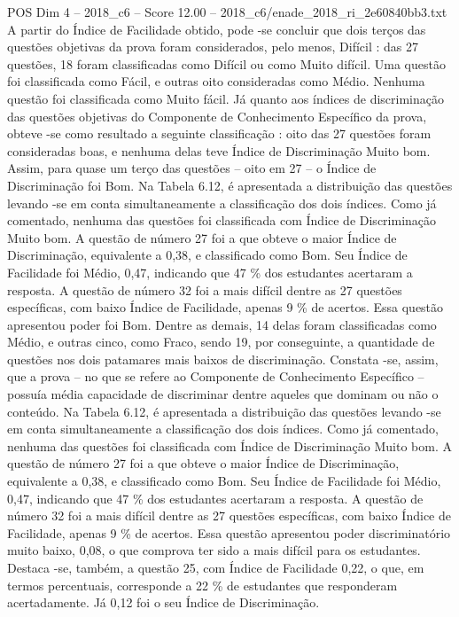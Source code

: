 \begin{textsample}{POS Dim 4 – 2018\_c6 – Score 12.00 – 2018\_c6/enade\_2018\_ri\_2e60840bb3.txt}
A partir do Índice de Facilidade obtido, pode -se concluir que dois terços das questões objetivas da prova foram considerados, pelo menos, Difícil : das 27 questões, 18 foram classificadas como Difícil ou como Muito difícil.
Uma questão foi classificada como Fácil, e outras oito consideradas como Médio.
Nenhuma questão foi classificada como Muito fácil.
Já quanto aos índices de discriminação das questões objetivas do Componente de Conhecimento Específico da prova, obteve -se como resultado a seguinte classificação : oito das 27 questões foram consideradas boas, e nenhuma delas teve Índice de Discriminação Muito bom.
Assim, para quase um terço das questões – oito em 27 – o Índice de Discriminação foi Bom.
Na Tabela 6.12, é apresentada a distribuição das questões levando -se em conta simultaneamente a classificação dos dois índices.
Como já comentado, nenhuma das questões foi classificada com Índice de Discriminação Muito bom.
A questão de número 27 foi a que obteve o maior Índice de Discriminação, equivalente a 0,38, e classificado como Bom.
Seu Índice de Facilidade foi Médio, 0,47, indicando que 47 \% dos estudantes acertaram a resposta.
A questão de número 32 foi a mais difícil dentre as 27 questões específicas, com baixo Índice de Facilidade, apenas 9 \% de acertos.
Essa questão apresentou poder foi Bom.
Dentre as demais, 14 delas foram classificadas como Médio, e outras cinco, como Fraco, sendo 19, por conseguinte, a quantidade de questões nos dois patamares mais baixos de discriminação.
Constata -se, assim, que a prova – no que se refere ao Componente de Conhecimento Específico – possuía média capacidade de discriminar dentre aqueles que dominam ou não o conteúdo.
Na Tabela 6.12, é apresentada a distribuição das questões levando -se em conta simultaneamente a classificação dos dois índices.
Como já comentado, nenhuma das questões foi classificada com Índice de Discriminação Muito bom.
A questão de número 27 foi a que obteve o maior Índice de Discriminação, equivalente a 0,38, e classificado como Bom.
Seu Índice de Facilidade foi Médio, 0,47, indicando que 47 \% dos estudantes acertaram a resposta.
A questão de número 32 foi a mais difícil dentre as 27 questões específicas, com baixo Índice de Facilidade, apenas 9 \% de acertos.
Essa questão apresentou poder discriminatório muito baixo, 0,08, o que comprova ter sido a mais difícil para os estudantes.
Destaca -se, também, a questão 25, com Índice de Facilidade 0,22, o que, em termos percentuais, corresponde a 22 \% de estudantes que responderam acertadamente.
Já 0,12 foi o seu Índice de Discriminação.

\end{textsample}
